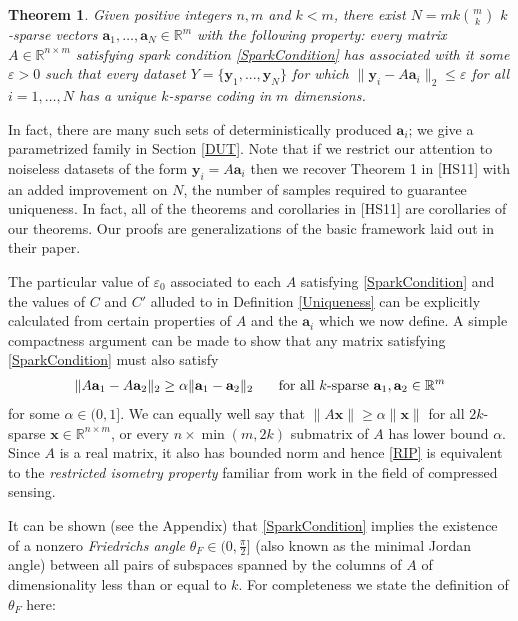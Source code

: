 \documentclass[journal, onecolumn]{IEEEtran}
\newtheorem{theorem}{Theorem}
\begin{document}
\begin{theorem}\label{DeterministicUniquenessTheorem}
Given positive integers $n, m$ and $k < m$, there exist $N =  mk{m \choose k}$ $k$-sparse vectors $\mathbf{a}_1, \ldots, \mathbf{a}_N \in \mathbb{R}^m$ with the following property: every matrix $A \in \mathbb{R}^{n \times m}$ satisfying spark condition \eqref{SparkCondition} has associated with it some $\varepsilon > 0$ such that every dataset $Y = \{ \mathbf{y}_1, ..., \mathbf{y}_N \}$ for which $\| \mathbf{y}_i - A\mathbf{a}_i \|_2 \leq \varepsilon$ for all $i = 1, \ldots, N$ has a unique $k$-sparse coding in $m$ dimensions. 
\end{theorem}

In fact, there are many such sets of deterministically produced $\mathbf{a}_i$; we give a parametrized family in Section \ref{DUT}. Note that if we restrict our attention to noiseless datasets of the form $\mathbf{y}_i = A\mathbf{a}_i$ then we recover Theorem 1 in [HS11] with an added improvement on $N$, the number of samples required to guarantee uniqueness. In fact, all of the theorems and corollaries in [HS11] are corollaries of our theorems. Our proofs are generalizations of the basic framework laid out in their paper.

The particular value of $\varepsilon_0$ associated to each $A$ satisfying \eqref{SparkCondition} and the values of $C$ and $C'$ alluded to in Definition \ref{Uniqueness} can be explicitly calculated from certain properties of $A$ and the $\mathbf{a}_i$ which we now define. A simple compactness argument can be made to show that any matrix satisfying \eqref{SparkCondition} must also satisfy
\begin{align}\label{RIP}
\|A\mathbf{a}_1 - A\mathbf{a}_2 \|_2 \geq  \alpha \|\mathbf{a}_1 - \mathbf{a}_2\|_2 \indent \text{ for all $k$-sparse } \mathbf{a}_1, \mathbf{a}_2 \in \mathbb{R}^m
\end{align}
%
for some $\alpha \in (0,1]$. We can equally well say that $\|A\mathbf{x}\| \geq \alpha\|\mathbf{x}\|$ for all $2k$-sparse $\mathbf{x} \in \mathbb{R}^{n \times m}$, or every $n \times \min(m,2k)$ submatrix of $A$ has lower bound $\alpha$. Since $A$ is a real matrix, it also has bounded norm and hence \eqref{RIP} is equivalent to the \emph{restricted isometry property} \cite{CandesTao05} familiar from work in the field of compressed sensing.

It can be shown (see the Appendix) that \eqref{SparkCondition} implies the existence of a nonzero \emph{Friedrichs angle} $\theta_F \in (0,\frac{\pi}{2}]$ (also known as the minimal Jordan angle) between all pairs of subspaces spanned by the columns of $A$ of dimensionality less than or equal to $k$. For completeness we state the definition of $\theta_F$ here:
\end{document}
